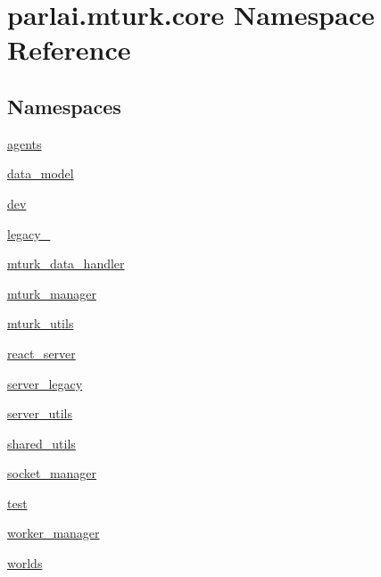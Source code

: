 \hypertarget{namespaceparlai_1_1mturk_1_1core}{}\section{parlai.\+mturk.\+core Namespace Reference}
\label{namespaceparlai_1_1mturk_1_1core}
\subsection*{Namespaces}
\begin{DoxyCompactItemize}
\item 
 \hyperlink{namespaceparlai_1_1mturk_1_1core_1_1agents}{agents}
\item 
 \hyperlink{namespaceparlai_1_1mturk_1_1core_1_1data__model}{data\+\_\+model}
\item 
 \hyperlink{namespaceparlai_1_1mturk_1_1core_1_1dev}{dev}
\item 
 \hyperlink{namespaceparlai_1_1mturk_1_1core_1_1legacy__2018}{legacy\+\_}
\item 
 \hyperlink{namespaceparlai_1_1mturk_1_1core_1_1mturk__data__handler}{mturk\+\_\+data\+\_\+handler}
\item 
 \hyperlink{namespaceparlai_1_1mturk_1_1core_1_1mturk__manager}{mturk\+\_\+manager}
\item 
 \hyperlink{namespaceparlai_1_1mturk_1_1core_1_1mturk__utils}{mturk\+\_\+utils}
\item 
 \hyperlink{namespaceparlai_1_1mturk_1_1core_1_1react__server}{react\+\_\+server}
\item 
 \hyperlink{namespaceparlai_1_1mturk_1_1core_1_1server__legacy}{server\+\_\+legacy}
\item 
 \hyperlink{namespaceparlai_1_1mturk_1_1core_1_1server__utils}{server\+\_\+utils}
\item 
 \hyperlink{namespaceparlai_1_1mturk_1_1core_1_1shared__utils}{shared\+\_\+utils}
\item 
 \hyperlink{namespaceparlai_1_1mturk_1_1core_1_1socket__manager}{socket\+\_\+manager}
\item 
 \hyperlink{namespaceparlai_1_1mturk_1_1core_1_1test}{test}
\item 
 \hyperlink{namespaceparlai_1_1mturk_1_1core_1_1worker__manager}{worker\+\_\+manager}
\item 
 \hyperlink{namespaceparlai_1_1mturk_1_1core_1_1worlds}{worlds}
\end{DoxyCompactItemize}

